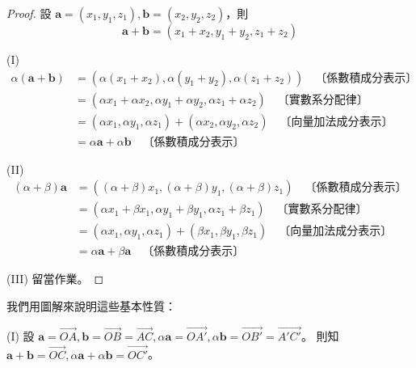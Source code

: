 \begin{proof}
設 $\mathbf{a} = (x_1, y_1, z_1), \mathbf{b} = (x_2, y_2, z_2)$，則
\[ \mathbf{a} + \mathbf{b} = (x_1 + x_2, y_1 + y_2, z_1 + z_2) \]

(I)
\begin{align*}
\alpha(\mathbf{a} + \mathbf{b}) &= (\alpha(x_1 + x_2), \alpha(y_1 + y_2), \alpha(z_1 + z_2)) \quad \text{〔係數積成分表示〕} \\
&= (\alpha x_1 + \alpha x_2, \alpha y_1 + \alpha y_2, \alpha z_1 + \alpha z_2) \quad \text{〔實數系分配律〕} \\
&= (\alpha x_1, \alpha y_1, \alpha z_1) + (\alpha x_2, \alpha y_2, \alpha z_2) \quad \text{〔向量加法成分表示〕} \\
&= \alpha\mathbf{a} + \alpha\mathbf{b} \quad \text{〔係數積成分表示〕}
\end{align*}

(II)
\begin{align*}
(\alpha + \beta)\mathbf{a} &= ((\alpha + \beta)x_1, (\alpha + \beta)y_1, (\alpha + \beta)z_1) \quad \text{〔係數積成分表示〕} \\
&= (\alpha x_1 + \beta x_1, \alpha y_1 + \beta y_1, \alpha z_1 + \beta z_1) \quad \text{〔實數系分配律〕} \\
&= (\alpha x_1, \alpha y_1, \alpha z_1) + (\beta x_1, \beta y_1, \beta z_1) \quad \text{〔向量加法成分表示〕} \\
&= \alpha\mathbf{a} + \beta\mathbf{a} \quad \text{〔係數積成分表示〕}
\end{align*}

(III) 留當作業。\qedhere
\end{proof}

我們用圖解來說明這些基本性質：

(I) 設 $\mathbf{a} = \vec{OA}, \mathbf{b} = \vec{OB} = \vec{AC}, \alpha\mathbf{a} = \vec{OA'}, \alpha\mathbf{b} = \vec{OB'} = \vec{A'C'}$。
則知 $\mathbf{a} + \mathbf{b} = \vec{OC}, \alpha\mathbf{a} + \alpha\mathbf{b} = \vec{OC'}$。

